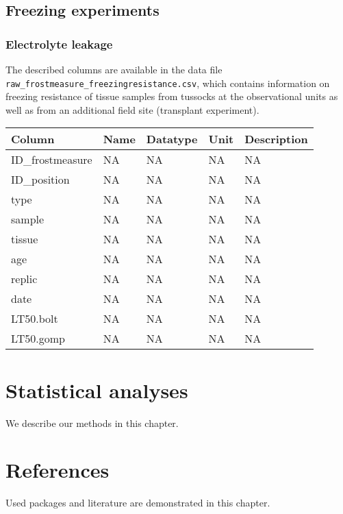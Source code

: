 \documentclass[
]{book}
\begin{document}
\hypertarget{freezing-experiments}{%
\section{Freezing experiments}\label{freezing-experiments}}

\hypertarget{electrolyte-leakage}{%
\subsection{Electrolyte leakage}\label{electrolyte-leakage}}

The described columns are available in the data file \texttt{raw\_frostmeasure\_freezingresistance.csv}, which contains information on freezing resistance of tissue samples from tussocks at the observational units as well as from an additional field site (transplant experiment).

\begin{tabular}{lllll}
\toprule
Column & Name & Datatype & Unit & Description\\
\midrule
ID\_frostmeasure & NA & NA & NA & NA\\
ID\_position & NA & NA & NA & NA\\
type & NA & NA & NA & NA\\
sample & NA & NA & NA & NA\\
tissue & NA & NA & NA & NA\\
\addlinespace
age & NA & NA & NA & NA\\
replic & NA & NA & NA & NA\\
date & NA & NA & NA & NA\\
LT50.bolt & NA & NA & NA & NA\\
LT50.gomp & NA & NA & NA & NA\\
\bottomrule
\end{tabular}

\hypertarget{statistical-analyses}{%
\chapter{Statistical analyses}\label{statistical-analyses}}

We describe our methods in this chapter.

\hypertarget{references}{%
\chapter{References}\label{references}}

Used packages and literature are demonstrated in this chapter.
\end{document}
